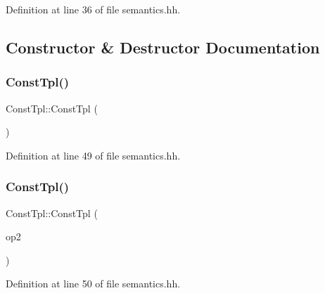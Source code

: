 Definition at line 36 of file semantics.\+hh.



\subsection{Constructor \& Destructor Documentation}
\mbox{\label{class_const_tpl_ab6740169364924eba7cf0901c6a12380}} 
\subsubsection{\texorpdfstring{ConstTpl()}{ConstTpl()}\hspace{0.1cm}{\footnotesize\ttfamily [1/7]}}
{\footnotesize\ttfamily Const\+Tpl\+::\+Const\+Tpl (\begin{DoxyParamCaption}\item[{void}]{ }\end{DoxyParamCaption})\hspace{0.3cm}{\ttfamily [inline]}}



Definition at line 49 of file semantics.\+hh.

\mbox{\label{class_const_tpl_ae3a5265248a081e1aa47c16b39dfcaf7}} 
\subsubsection{\texorpdfstring{ConstTpl()}{ConstTpl()}\hspace{0.1cm}{\footnotesize\ttfamily [2/7]}}
{\footnotesize\ttfamily Const\+Tpl\+::\+Const\+Tpl (\begin{DoxyParamCaption}\item[{const \mbox{\hyperlink{class_const_tpl}{Const\+Tpl}} \&}]{op2 }\end{DoxyParamCaption})\hspace{0.3cm}{\ttfamily [inline]}}



Definition at line 50 of file semantics.\+hh.

\mbox{\label{class_const_tpl_a5cd6bb0244ddd590c39911370fcb51a2}} 
